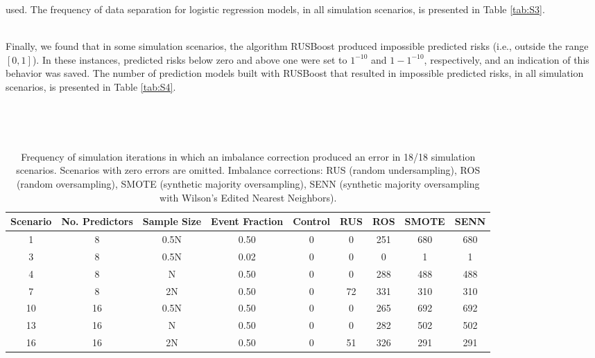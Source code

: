 \documentclass[
]{article}
\begin{document}
used. The frequency of data separation for logistic regression models,
in all simulation scenarios, is presented in Table \ref{tab:S3}.\\
\strut \\
Finally, we found that in some simulation scenarios, the algorithm
RUSBoost produced impossible predicted risks (i.e., outside the range
\([0,1]\)). In these instances, predicted risks below zero and above one
were set to \(1^{-10}\) and \(1 - 1^{-10}\), respectively, and an
indication of this behavior was saved. The number of prediction models
built with RUSBoost that resulted in impossible predicted risks, in all
simulation scenarios, is presented in Table \ref{tab:S4}.\\
\strut \\
\strut \\

\begin{table}[!h]
\renewcommand\thetable{S1} 
\caption{\label{tab:S1} Frequency of simulation iterations in which an imbalance correction produced an error in 18/18 simulation scenarios.  Scenarios with zero errors are omitted. Imbalance corrections: RUS (random undersampling), ROS (random oversampling), SMOTE (synthetic majority oversampling), SENN (synthetic majority oversampling with Wilson's Edited Nearest Neighbors).}
\centering
\begin{tabular}[t]{ccccccccc}
\toprule
Scenario & No. Predictors & Sample Size & Event Fraction & Control & RUS & ROS & SMOTE & SENN\\
\midrule
1 & 8 & 0.5N & 0.50 & 0 & 0 & 251 & 680 & 680\\
 
3 & 8 & 0.5N & 0.02 & 0 & 0 & 0 & 1 & 1\\
 
4 & 8 & N & 0.50 & 0 & 0 & 288 & 488 & 488\\
 
7 & 8 & 2N & 0.50 & 0 & 72 & 331 & 310 & 310\\
 
10 & 16 & 0.5N & 0.50 & 0 & 0 & 265 & 692 & 692\\
 
13 & 16 & N & 0.50 & 0 & 0 & 282 & 502 & 502\\
 
16 & 16 & 2N & 0.50 & 0 & 51 & 326 & 291 & 291\\
\bottomrule
\end{tabular}
\end{table}
\end{document}

